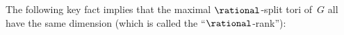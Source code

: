 %
% 
%
%



The following key fact implies that the maximal $\rational$-split tori of~$G$ all have the same dimension (which is called the ``$\rational$-rank''):

